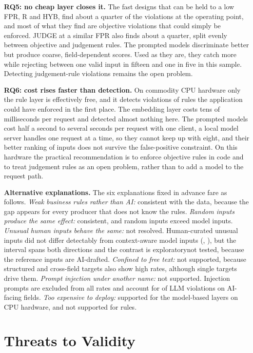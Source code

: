 \documentclass[conference]{IEEEtran}
\begin{document}
\textbf{RQ5: no cheap layer closes it.} The fast designs that can be held to a low FPR, R and HYB, find
about a quarter of the violations at the operating point, and most of what they find are objective
violations that could simply be enforced. JUDGE at a similar FPR also finds about a quarter, split
evenly between objective and judgement rules. The prompted models discriminate better but produce
coarse, field-dependent scores. Used as they are, they catch more while rejecting between one valid
input in fifteen and one in five in this sample. Detecting judgement-rule violations remains the open
problem.

\textbf{RQ6: cost rises faster than detection.} On commodity CPU hardware only the rule layer is
effectively free, and it detects violations of rules the application could have enforced in the first
place. The embedding layer costs tens of milliseconds per request and detected almost nothing here. The prompted models cost half a second to several seconds per request with one client, a local model
server handles one request at a time, so they cannot keep up with eight, and their better ranking of
inputs does not survive the false-positive constraint. On this hardware the practical recommendation is to
enforce objective rules in code and to treat judgement rules as an open problem, rather than to add a
model to the request path.

\textbf{Alternative explanations.} The six explanations fixed in advance fare as follows. \emph{Weak
business rules rather than AI:} consistent with the data, because the gap appears for every producer
that does not know the rules. \emph{Random inputs produce the same effect:} consistent, and random
inputs exceed model inputs. \emph{Unusual human inputs behave the same:} \ifreviewed not resolved.
Human-curated unusual inputs did not differ detectably from context-aware model inputs
(, ), but the interval spans both directions and the contrast is
exploratory\else not tested, because the reference inputs are AI-drafted\fi. \emph{Confined to free
text:} not supported, because structured and cross-field targets also show high rates, although single
targets drive them. \emph{Prompt injection under another name:} not supported. Injection prompts are
excluded from all rates and account for  of  LLM violations on AI-facing
fields. \emph{Too expensive to deploy:} supported for the model-based layers on CPU hardware, and not
supported for rules.

\section{Threats to Validity}
\label{sec:threats}
\end{document}
